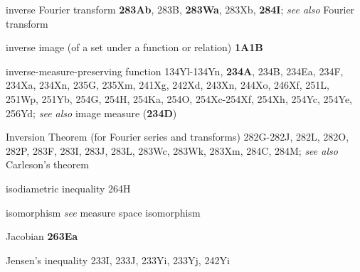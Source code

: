  




inverse Fourier transform {\bf 283Ab}, 283B, {\bf 283Wa}, 283Xb,
{\bf 284I};
  {\it see also} Fourier transform


inverse image (of a set under a function or relation) {\bf 1A1B}


inverse-measure-preserving function
134Yl-134Yn, 
  {\bf 234A}, 234B, 234Ea, 234F, 234Xa, 234Xn, 235G, 235Xm, 241Xg,
242Xd, 243Xn, 244Xo, 246Xf, 251L, 251Wp, 251Yb,
254G, 254H, 254Ka, 254O, 254Xc-254Xf, 
254Xh, 254Yc, 254Ye, 256Yd; 
  {\it see also }
image measure ({\bf 234D})




Inversion Theorem (for Fourier series and transforms)
282G-282J, 
282L, 282O, 282P, 283F, 283I, 283J, 283L, 283Wc, 283Wk, 283Xm,
284C, 284M;
  {\it see also} Carleson's theorem


















isodiametric inequality 264H














isomorphism {\it see} 
  measure space isomorphism










\indexmedskip

Jacobian {\bf 263Ea}











Jensen's inequality 233I, 233J, 233Yi, 233Yj, 242Yi






